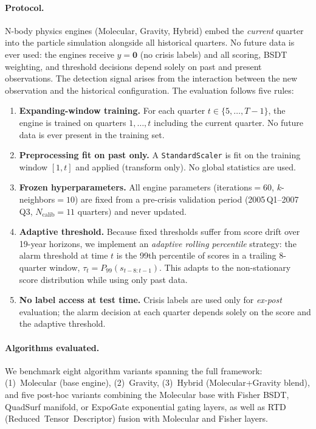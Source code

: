 \documentclass[final]{siamltex}
\begin{document}
\paragraph{Protocol.}
N-body physics engines (Molecular, Gravity, Hybrid) embed the
\emph{current} quarter into the particle simulation alongside
all historical quarters.  No future data is ever used: the
engines receive $y = \mathbf{0}$ (no crisis labels) and all
scoring, BSDT weighting, and threshold decisions depend solely
on past and present observations.  The detection signal arises
from the interaction between the new observation and the
historical configuration.  The evaluation follows five rules:
\begin{enumerate}
\item \textbf{Expanding-window training.}  For each quarter
  $t \in \{5, \ldots, T{-}1\}$, the engine is trained on quarters
  $1, \ldots, t$ including the current quarter.  No future data is
  ever present in the training set.
\item \textbf{Preprocessing fit on past only.}
  A \texttt{StandardScaler} is fit on the training window
  $[1, t]$ and applied (transform only).  No global statistics
  are used.
\item \textbf{Frozen hyperparameters.}  All engine parameters
  (iterations${}=60$, $k$-neighbors${}=10$) are fixed from a
  pre-crisis validation period (2005\,Q1--2007\,Q3,
  $N_{\mathrm{calib}}=11$ quarters) and never updated.
\item \textbf{Adaptive threshold.}  Because fixed thresholds
  suffer from score drift over 19-year horizons, we implement
  an \emph{adaptive rolling percentile} strategy: the alarm
  threshold at time $t$ is the 99th percentile of scores in a
  trailing 8-quarter window, $\tau_t = P_{99}(s_{t-8:t-1})$.
  This adapts to the non-stationary score distribution while
  using only past data.
\item \textbf{No label access at test time.}  Crisis labels are
  used only for \emph{ex-post} evaluation; the alarm decision at
  each quarter depends solely on the score and the adaptive
  threshold.
\end{enumerate}

\paragraph{Algorithms evaluated.}
We benchmark eight algorithm variants spanning the full framework:
(1)~Molecular (base engine), (2)~Gravity, (3)~Hybrid
(Molecular+Gravity blend), and five post-hoc variants combining
the Molecular base with Fisher BSDT, QuadSurf manifold, or
ExpoGate exponential gating layers, as well as RTD
(Reduced~Tensor~Descriptor) fusion with Molecular and Fisher
layers.
\end{document}
